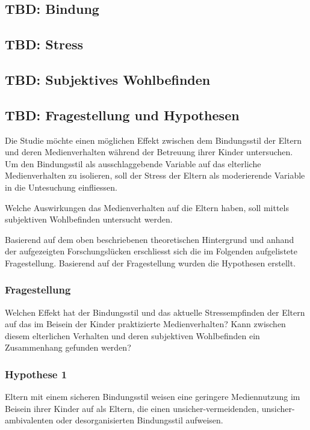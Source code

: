 \subsection{TBD: Bindung}\label{sec:Bindung}

\subsection{TBD: Stress}\label{sec:Stress}

\subsection{TBD: Subjektives Wohlbefinden}\label{sec:Swb}






\subsection{TBD: Fragestellung und Hypothesen} \label{sec:Fragestellung}
Die Studie möchte einen möglichen Effekt zwischen dem Bindungsstil der Eltern und deren Medienverhalten während der Betreuung ihrer Kinder untersuchen. Um den Bindungsstil als ausschlaggebende Variable auf das elterliche Medienverhalten zu isolieren, soll der Stress der Eltern als moderierende Variable in die Untesuchung einfliessen.

Welche Auswirkungen das Medienverhalten auf die Eltern haben, soll mittels subjektiven Wohlbefinden  untersucht werden. 

Basierend auf dem oben beschriebenen theoretischen Hintergrund und anhand der aufgezeigten Forschungslücken erschliesst sich die im Folgenden aufgelistete Fragestellung. Basierend auf der Fragestellung wurden die Hypothesen erstellt.
\subsubsection{Fragestellung} 
Welchen Effekt hat der Bindungsstil und das aktuelle Stressempfinden der Eltern auf das im Beisein der Kinder praktizierte Medienverhalten? Kann zwischen diesem elterlichen Verhalten und deren subjektiven Wohlbefinden ein Zusammenhang gefunden werden?
\subsubsection{Hypothese 1}
Eltern mit einem sicheren Bindungsstil weisen eine geringere Mediennutzung im Beisein ihrer Kinder auf als Eltern, die einen unsicher-vermeidenden, unsicher-ambivalenten oder desorganisierten Bindungsstil aufweisen.
